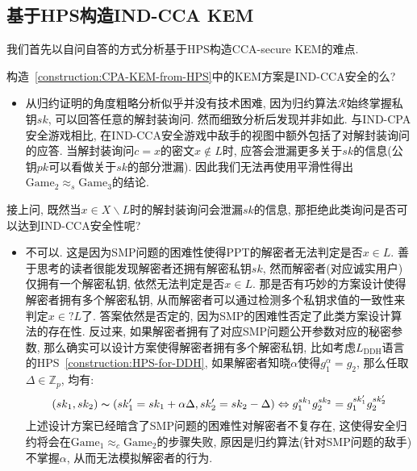 \subsection{基于HPS构造IND-CCA KEM}
我们首先以自问自答的方式分析基于HPS构造CCA-secure KEM的难点. 
\begin{trivlist}
\item 构造~\ref{construction:CPA-KEM-from-HPS}中的KEM方案是IND-CCA安全的么? 
\begin{itemize}
\item 从归约证明的角度粗略分析似乎并没有技术困难, 因为归约算法$\mathcal{R}$始终掌握私钥$sk$, 可以回答任意的解封装询问. 
    然而细致分析后发现并非如此. 与IND-CPA安全游戏相比, 在IND-CCA安全游戏中敌手的视图中额外包括了对解封装询问的应答. 
    当解封装询问$c = x$的密文$x \notin L$时, 应答会泄漏更多关于$sk$的信息(公钥$pk$可以看做关于$sk$的部分泄漏). 
    因此我们无法再使用平滑性得出$\text{Game}_2 \approx_s \text{Game}_3$的结论. 
\end{itemize}

\item 接上问, 既然当$x \in X \backslash L$时的解封装询问会泄漏$sk$的信息, 那拒绝此类询问是否可以达到IND-CCA安全性呢?
\begin{itemize} 
\item 不可以. 这是因为SMP问题的困难性使得PPT的解密者无法判定是否$x \in L$. 
    善于思考的读者很能发现解密者还拥有解密私钥$sk$, 然而解密者(对应诚实用户)仅拥有一个解密私钥, 依然无法判定是否$x \in L$. 
    那是否有巧妙的方案设计使得解密者拥有多个解密私钥, 从而解密者可以通过检测多个私钥求值的一致性来判定$x \in ? L$了. 
    答案依然是否定的, 因为SMP的困难性否定了此类方案设计算法的存在性. 
    反过来, 如果解密者拥有了对应SMP问题公开参数对应的秘密参数, 那么确实可以设计方案使得解密者拥有多个解密私钥, 
    比如考虑$L_\text{DDH}$语言的HPS~\ref{construction:HPS-for-DDH}, 如果解密者知晓$\alpha$使得$g_1^\alpha = g_2$, 那么任取$\Delta \in \mathbb{Z}_p$, 均有: 
    \begin{equation*}
        (sk_1, sk_2) \thicksim (sk_1' = sk_1+\alpha \Delta, sk_2' = sk_2-\Delta) \Leftrightarrow g_1^{sk_1} g_2^{sk_2} = g_1^{sk_1'} g_2^{sk_2'}
    \end{equation*}
    上述设计方案已经暗含了SMP问题的困难性对解密者不复存在, 这使得安全归约将会在$\text{Game}_1 \approx_c \text{Game}_2$的步骤失败, 
    原因是归约算法(针对SMP问题的敌手)不掌握$\alpha$, 从而无法模拟解密者的行为.  
\end{itemize}
\end{trivlist}

